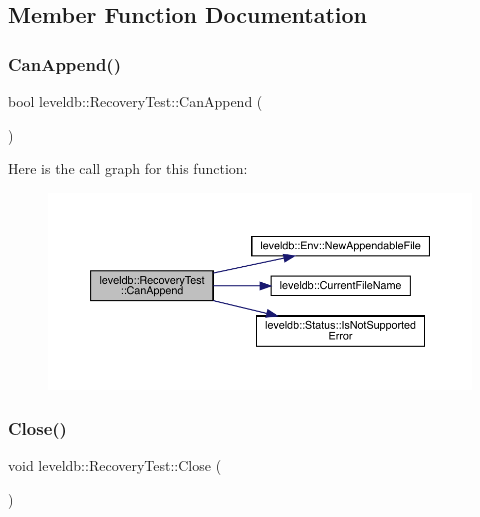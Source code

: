 \subsection{Member Function Documentation}
\mbox{\label{classleveldb_1_1_recovery_test_a7f2b97d648d2eb95bd1c9c29697e3389}} 
\subsubsection{\texorpdfstring{CanAppend()}{CanAppend()}}
{\footnotesize\ttfamily bool leveldb\+::\+Recovery\+Test\+::\+Can\+Append (\begin{DoxyParamCaption}{ }\end{DoxyParamCaption})\hspace{0.3cm}{\ttfamily [inline]}}

Here is the call graph for this function\+:
\nopagebreak
\begin{figure}[H]
\begin{center}
\leavevmode
\includegraphics[width=350pt]{classleveldb_1_1_recovery_test_a7f2b97d648d2eb95bd1c9c29697e3389_cgraph}
\end{center}
\end{figure}
\mbox{\label{classleveldb_1_1_recovery_test_a65077ffc562d9d4c5434166068836cbb}} 
\subsubsection{\texorpdfstring{Close()}{Close()}}
{\footnotesize\ttfamily void leveldb\+::\+Recovery\+Test\+::\+Close (\begin{DoxyParamCaption}{ }\end{DoxyParamCaption})\hspace{0.3cm}{\ttfamily [inline]}}

